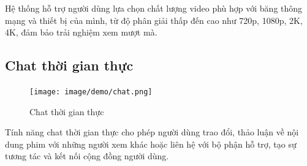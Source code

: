 Hệ thống hỗ trợ người dùng lựa chọn chất lượng video phù hợp với băng thông mạng và thiết bị của mình, từ độ phân giải thấp đến cao như 720p, 1080p, 2K, 4K, đảm bảo trải nghiệm xem mượt mà.


\subsection{Chat thời gian thực}
\begin{figure}[H]
	\centering
	\texttt{[image: image/demo/chat.png]}
	\caption{Chat thời gian thực}
\end{figure}

Tính năng chat thời gian thực cho phép người dùng trao đổi, thảo luận về nội dung phim với những người xem khác hoặc liên hệ với bộ phận hỗ trợ, tạo sự tương tác và kết nối cộng đồng người dùng.


